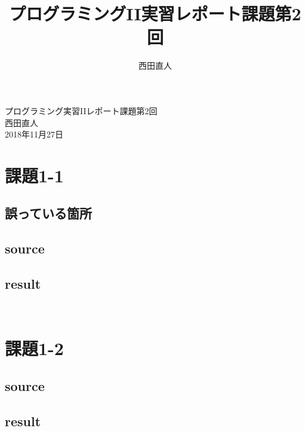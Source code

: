 \documentclass[10pt,a4paper]{jsarticle}
\title{プログラミングII実習レポート課題第2回}
\author{西田直人}
\begin{document}
\begin{center}
{\LARGE プログラミング実習IIレポート課題第2回} \\
\large
西田直人 \\ 2018年11月27日
\end{center}
\normalsize
\section{課題1-1}
\subsection{誤っている箇所}

\subsection{source}


\subsection{result}

\begin{lstlisting}[basicstyle=\ttfamily\footnotesize,frame=single,breaklines=tr\
  ue]
     
\end{lstlisting}


\section{課題1-2}

\subsection{source}



\subsection{result}
\begin{lstlisting}[basicstyle=\ttfamily\footnotesize,frame=single,breaklines=tr\
  ue]
  
\end{lstlisting}
\end{document}

